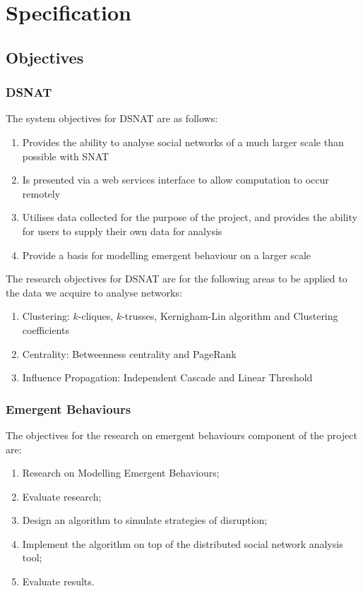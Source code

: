 \chapter{Specification}

\section{Objectives}

\subsection{DSNAT}

The system objectives for DSNAT are as follows:

\begin{enumerate}
  \item Provides the ability to analyse social networks of a much larger scale than possible with SNAT
  \item Is presented via a web services interface to allow computation to occur remotely
  \item Utilises data collected for the purpose of the project, and provides the ability for users to supply their own data for analysis
  \item Provide a basis for modelling emergent behaviour on a larger scale
\end{enumerate}

The research objectives for DSNAT are for the following areas to be applied to the data we acquire to analyse networks:

\begin{enumerate}
	\item Clustering: $k$-cliques, $k$-trusses, Kernigham-Lin algorithm and Clustering coefficients
	\item Centrality: Betweenness centrality and PageRank
	\item Influence Propagation: Independent Cascade and Linear Threshold
\end{enumerate}

\subsection{Emergent Behaviours}

The objectives for the research on emergent behaviours component of the project are:

\begin{enumerate}
	\item Research on Modelling Emergent Behaviours;
	\item Evaluate research;
	\item Design an algorithm to simulate strategies of disruption;
	\item Implement the algorithm on top of the distributed social network analysis tool;
	\item Evaluate results.
\end{enumerate}

